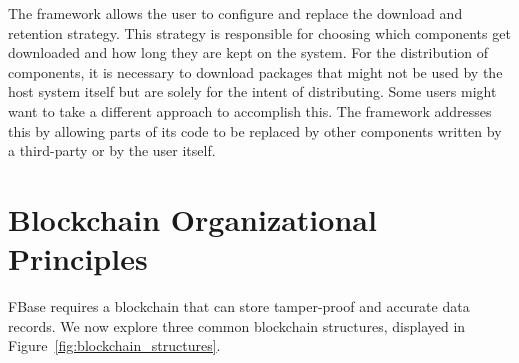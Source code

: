 The framework allows the user to configure and replace the download and retention strategy. This strategy is responsible for choosing which components get downloaded and how long they are kept on the system. For the distribution of components, it is necessary to download packages that might not be used by the host system itself but are solely for the intent of distributing. Some users might want to take a different approach to accomplish this. The framework addresses this by allowing parts of its code to be replaced by other components written by a third-party or by the user itself.

\section{Blockchain Organizational Principles}

FBase requires a blockchain that can store tamper-proof and accurate data records.
We now explore three common blockchain structures, displayed in Figure~\ref{fig:blockchain_structures}.

